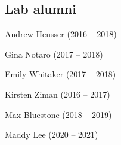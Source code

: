 \documentclass{tufte-book} %
\begin{document}
\begin{fullwidth}
\subsection{Lab alumni}
\begin{multicols}{2}\raggedcolumns
\begin{list}{\quad}{}
\item Andrew Heusser (2016 -- 2018)
\item Gina Notaro (2017 -- 2018)
\end{list}
\end{multicols}


\begin{multicols}{2}\raggedcolumns
\begin{list}{\quad}{}
\item Emily Whitaker (2017 -- 2018)
\item Kirsten Ziman (2016 -- 2017)
\end{list}
\end{multicols}


\begin{multicols}{2}\raggedcolumns
\begin{list}{\quad}{}
\item Max Bluestone (2018 -- 2019)
\item Maddy Lee (2020 -- 2021)
\end{list}
\end{multicols}



\end{fullwidth}
\end{document}
